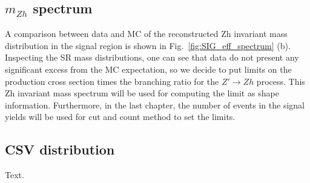 \subsection{$m_{Zh}$ spectrum}
A comparison between data and MC of the reconstructed Zh invariant mass distribution in the signal region is shown in Fig.~\ref{fig:SIG_eff_spectrum} (b). Inspecting the SR mass distributions, one can see that data do not present any significant excess from the MC expectation, so we decide to put limits on the production cross section times the branching ratio for the $Z' \rightarrow Zh$ process. This Zh invariant mass spectrum will be used for computing the limit as shape information. Furthermore, in the last chapter, the number of events in the signal yields will be used for cut and count method to set the limits.

\newpage
\subsection{CSV distribution}
Text.

